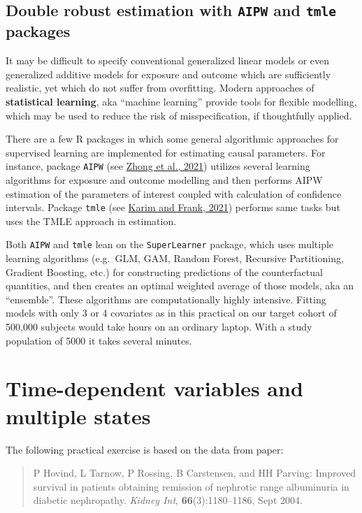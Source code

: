 \documentclass[
]{book}
\begin{document}
\section{\texorpdfstring{Double robust estimation with \texttt{AIPW} and \texttt{tmle} packages}{Double robust estimation with AIPW and tmle packages}}\label{double-robust-estimation-with-aipw-and-tmle-packages}

It may be difficult to specify
conventional generalized linear models
or even generalized additive
models for exposure and outcome which are
sufficiently realistic, yet which do not suffer from overfitting.
Modern approaches of \textbf{statistical learning}, aka
``machine learning'' provide tools for flexible modelling,
which may be used to reduce the risk of misspecification,
if thoughtfully applied.

There are a few R packages in which some general
algorithmic approaches for supervised learning
are implemented for estimating causal parameters.
For instance, package \texttt{AIPW}
(see \href{https://doi.org/10.1093/aje/kwab207}{Zhong et al., 2021})
utilizes
several learning algorithms for exposure and outcome modelling
and then performs AIPW estimation of the
parameters of interest coupled with
calculation of confidence intervals. Package \texttt{tmle}
(see \href{https://ehsanx.github.io/TMLEworkshop/}{Karim and Frank, 2021})
performs same tasks but uses the TMLE approach
in estimation.

Both \texttt{AIPW} and \texttt{tmle} lean on the
\texttt{SuperLearner} package, which uses multiple learning
algorithms (e.g.~GLM, GAM, Random Forest, Recursive Partitioning,
Gradient Boosting, etc.) for constructing
predictions of the counterfactual quantities, and
then creates an optimal weighted average of those models,
aka an ``ensemble''. These algorithms are computationally
highly intensive. Fitting models with only 3 or 4
covariates as in this practical
on our target cohort of 500,000 subjects
would take hours on an ordinary laptop. With a study population
of 5000 it takes several minutes.

\chapter{Time-dependent variables and multiple states}\label{time-dependent-variables-and-multiple-states}

The following practical exercise is based on the data from paper:

\begin{quote}
P Hovind, L Tarnow, P Rossing, B Carstensen, and HH Parving:
Improved survival in patients obtaining remission of nephrotic range
albuminuria in diabetic nephropathy.
\emph{Kidney Int}, \textbf{66}(3):1180--1186, Sept 2004.
\end{quote}
\end{document}
